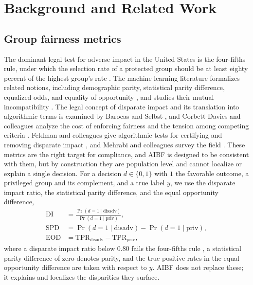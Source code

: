 \documentclass[conference]{IEEEtran}
\begin{document}
\section{Background and Related Work}
\label{sec:related}

\subsection{Group fairness metrics}
The dominant legal test for adverse impact in the United States is the four-fifths
rule, under which the selection rate of a protected group should be at least eighty
percent of the highest group's rate \cite{uniform}. The machine learning literature
formalizes related notions, including demographic parity, statistical parity
difference, equalized odds, and equality of opportunity \cite{dwork,hardt}, and
studies their mutual incompatibility \cite{chouldechova}. The legal concept of disparate impact and its translation into algorithmic terms is examined by Barocas and Selbst \cite{barocas_selbst}, and Corbett-Davies and colleagues analyze the cost of enforcing fairness and the tension among competing criteria \cite{corbett}. Feldman and colleagues give
algorithmic tests for certifying and removing disparate impact \cite{feldman}, and
Mehrabi and colleagues survey the field \cite{mehrabi}. These metrics are the right
target for compliance, and AIBF is designed to be consistent with them, but by
construction they are population level and cannot localize or explain a single
decision. For a decision $d\in\{0,1\}$ with $1$ the favorable outcome, a privileged
group and its complement, and a true label $y$, we use the disparate impact ratio, the
statistical parity difference, and the equal opportunity difference,
\begin{align}
\mathrm{DI} &= \frac{\Pr(d=1\mid \text{disadv})}{\Pr(d=1\mid \text{priv})}, \\
\mathrm{SPD} &= \Pr(d=1\mid \text{disadv}) - \Pr(d=1\mid \text{priv}), \\
\mathrm{EOD} &= \mathrm{TPR}_{\text{disadv}} - \mathrm{TPR}_{\text{priv}},
\end{align}
where a disparate impact ratio below $0.80$ fails the four-fifths rule \cite{uniform},
a statistical parity difference of zero denotes parity, and the true positive rates in
the equal opportunity difference are taken with respect to $y$. AIBF does not replace
these; it explains and localizes the disparities they surface.
\end{document}
